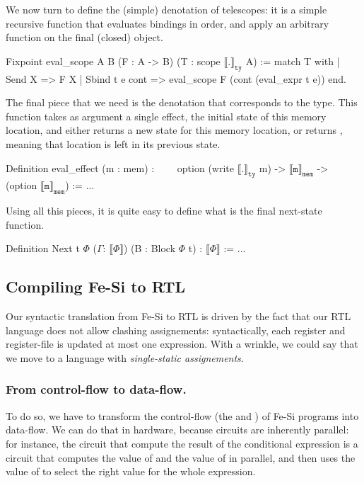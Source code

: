 \documentclass{llncs}
\newcommand{\denote}[1]{\llbracket #1 \rrbracket}
\newcommand{\denotety}[1]{\denote{\mathtt{#1}}_{\mathtt{ty}}}
\newcommand{\denotemem}[1]{\denote{\mathtt{#1}}_{\mathtt{mem}}}
\begin{document}
We now turn to define the (simple) denotation of telescopes: it is a
simple recursive function that evaluates bindings in order, and apply
an arbitrary function on the final (closed) object. 
\begin{coq}
Fixpoint eval_scope {A B} (F : A -> B) (T : scope $\denotety{.}$ A) :=
match T with 
| Send X => F X
| Sbind t e cont => eval_scope F (cont (eval_expr t e))
end.   
\end{coq}
%
The final piece that we need is the denotation that corresponds to the
 type. This function takes as argument a single effect,
the initial state of this memory location, and either returns a new
state for this memory location, or returns , meaning that
location is left in its previous state.
\begin{coq}
Definition eval_effect (m : mem) : 
$\qquad$option (write $\denotety{.}$ m) -> $\denotemem{m}$ -> (option $\denotemem{m}$) := ... 
\end{coq}
%
Using all this pieces, it is quite easy to define what is the final
next-state function. 
\begin{coq}
Definition Next {t} $\Phi$ ($\Gamma$: $\denote{\Phi}$) (B : Block $\Phi$ t) : $\denote{\Phi}$ := ...
\end{coq}

\subsection{Compiling Fe-Si to RTL} 
Our syntactic translation from Fe-Si to RTL is driven by the fact that
our RTL language does not allow clashing assignements: syntactically,
each register and register-file is updated at most one 
expression.
%
With a wrinkle, we could say that we move to a language with
\emph{single-static assignements}. 

\subsubsection{From control-flow to data-flow.}To do so, we have to transform
the control-flow (the  and ) of Fe-Si
programs into data-flow.
%
We can do that in hardware, because circuits are inherently parallel:
for instance, the circuit that compute the result of the conditional
expression \mbox{} is a circuit that computes the value of
 and the value of  in parallel, and then uses the
value of  to select the right value for the whole expression. 
\end{document}
